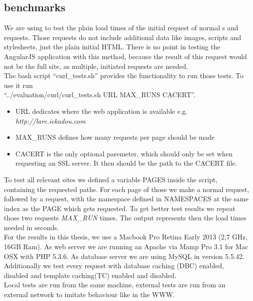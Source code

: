 \subsection{\curl{} benchmarks\label{curl}}
We are using \curl{} to test the plain load times of the initial request of normal \httpRequest{}s and \lare{} requests.
Those \curl{} requests do not include additional data like images, scripts and stylesheets, just the plain initial HTML.
There is no point in testing the AngularJS application with this method, because the result of this request would not be the full site, as multiple, \ajax{} initiated requests are needed.
\\
The bash script \enquote{curl\_tests.sh} provides the functionality to run those \curl{} tests.
To use it run
\\
\enquote{../evaluation/curl/curl\_tests.sh URL MAX\_RUNS CACERT}.
\\
\begin{itemize}
    \item URL dedicates where the web application is available e.g. \emph{http://lare.iekadou.com}
    \item MAX\_RUNS defines how many \curl{} requests per page should be made
    \item CACERT is the only optional paremeter, which should only be set when requesting an SSL server. It then should be the path to the CACERT file.
\end{itemize}

\noindent{}To test all relevant sites we defined a variable PAGES inside the script, containing the requested paths.
For each page of those we make a normal request, followed by a \lare{} request, with the namespace defined in NAMESPACES at the same index as the PAGE which gets requested.
To get better test results we repeat those two requests \emph{MAX\_RUN} times. The output represents then the load times needed in seconds.
\\
For the results in this thesis, we use a Macbook Pro Retina Early 2013 (2,7 GHz, 16GB Ram).
As web server we are running an Apache via Mamp Pro 3.1 for Mac OSX with PHP 5.3.6.
As database server we are using MySQL in version 5.5.42.
\\
Additionally we test every request with database caching (DBC) enabled, disabled and template caching(TC) enabled and disabled.
\\
Local tests are run from the same machine, external tests are run from an external network to imitate behaviour like in the WWW.

